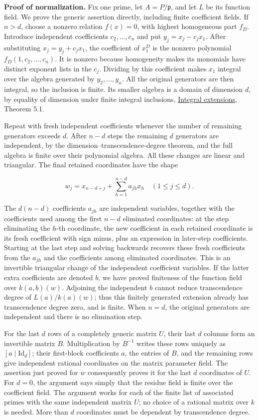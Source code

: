 \documentclass[
]{article}
\begin{document}
\textbf{Proof of normalization.} Fix one prime, let \(A=P/\mathfrak p\),
and let \(L\) be its function field. We prove the generic assertion
directly, including finite coefficient fields. If \(n>d\), choose a
nonzero relation \(f(x)=0\), with highest homogeneous part \(f_D\).
Introduce independent coefficients \(c_2,\ldots,c_n\) and put
\(y_j=x_j-c_jx_1\). After substituting \(x_j=y_j+c_jx_1\), the
coefficient of \(x_1^D\) is the nonzero polynomial
\(f_D(1,c_2,\ldots,c_n)\). It is nonzero because homogeneity makes its
monomials have distinct exponent lists in the \(c_j\). Dividing by this
coefficient makes \(x_1\) integral over the algebra generated by
\(y_2,\ldots,y_n\). All the original generators are then integral, so
the inclusion is finite. Its smaller algebra is a domain of dimension
\(d\), by equality of dimension under finite integral inclusions,
\href{../prerequisites/AG-CA/AG-CA-05.html}{Integral extensions},
Theorem 5.1.

Repeat with fresh independent coefficients whenever the number of
remaining generators exceeds \(d\). After \(n-d\) steps the remaining
\(d\) generators are independent, by the dimension--transcendence-degree
theorem, and the full algebra is finite over their polynomial algebra.
All these changes are linear and triangular. The final retained
coordinates have the shape

\[
w_j=x_{n-d+j}+\sum_{h=1}^{n-d}a_{jh}x_h\quad(1\le j\le d).
\]

The \(d(n-d)\) coefficients \(a_{jh}\) are independent variables,
together with the coefficients used among the first \(n-d\) eliminated
coordinates: at the step eliminating the \(h\)-th coordinate, the new
coefficient in each retained coordinate is its fresh coefficient with
sign minus, plus an expression in later-step coefficients. Starting at
the last step and solving backwards recovers these fresh coefficients
from the \(a_{jh}\) and the coefficients among eliminated coordinates.
This is an invertible triangular change of the independent coefficient
variables. If the latter extra coefficients are denoted \(b\), we have
proved finiteness of the function field over \(k(a,b)(w)\). Adjoining
the independent \(b\) cannot reduce transcendence degree of
\(L(a)/k(a)(w)\); thus this finitely generated extension already has
transcendence degree zero, and is finite. When \(n=d\), the original
generators are independent and there is no elimination step.

For the last \(d\) rows of a completely generic matrix \(U\), their last
\(d\) columns form an invertible matrix \(B\). Multiplication by
\(B^{-1}\) writes these rows uniquely as \([a\mid\mathrm{Id}_d]\); their
first-block coefficients \(a\), the entries of \(B\), and the remaining
rows give independent rational coordinates on the matrix parameter
field. The assertion just proved for \(w\) consequently proves it for
the last \(d\) coordinates of \(U\). For \(d=0\), the argument says
simply that the residue field is finite over the coefficient field. The
argument works for each of the finite list of associated primes with the
same independent matrix \(U\); no choice of a rational matrix over \(k\)
is needed. More than \(d\) coordinates must be dependent by
transcendence degree.
\end{document}
